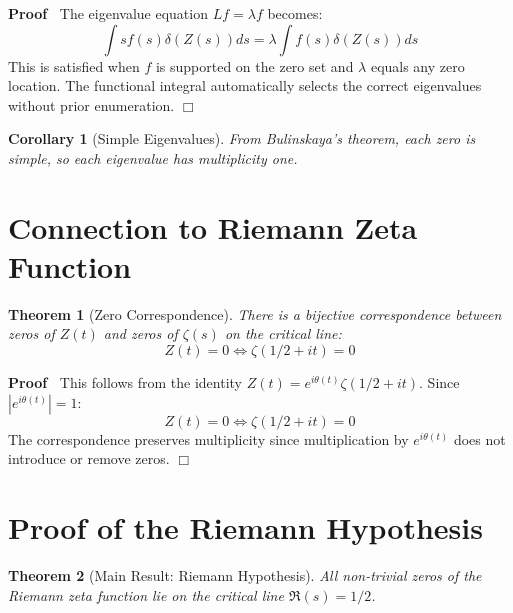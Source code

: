 \documentclass{article}
\newenvironment{proof}{\noindent\textbf{Proof\ }}{\hspace*{\fill}$\Box$\medskip}
\newtheorem{corollary}{Corollary}
\newtheorem{theorem}{Theorem}
\begin{document}
\begin{proof}
  The eigenvalue equation $Lf = \lambda f$ becomes:
  \begin{equation}
    \int sf (s) \delta (Z (s)) ds = \lambda \int f (s) \delta (Z (s)) ds
  \end{equation}
  This is satisfied when $f$ is supported on the zero set and $\lambda$ equals
  any zero location. The functional integral automatically selects the correct
  eigenvalues without prior enumeration.
\end{proof}

\begin{corollary}
  [Simple Eigenvalues] From Bulinskaya's theorem, each zero is simple, so each
  eigenvalue has multiplicity one.
\end{corollary}

\section{Connection to Riemann Zeta Function}

\begin{theorem}
  [Zero Correspondence] There is a bijective correspondence between zeros of
  $Z (t)$ and zeros of $\zeta (s)$ on the critical line:
  \begin{equation}
    Z (t) = 0 \Leftrightarrow \zeta (1 / 2 + it) = 0
  \end{equation}
\end{theorem}

\begin{proof}
  This follows from the identity $Z (t) = e^{i \theta (t)} \zeta (1 / 2 +
  it)$. Since $|e^{i \theta (t)} | = 1$:
  \begin{equation}
    Z (t) = 0 \Leftrightarrow \zeta (1 / 2 + it) = 0
  \end{equation}
  The correspondence preserves multiplicity since multiplication by $e^{i
  \theta (t)}$ does not introduce or remove zeros.
\end{proof}

\section{Proof of the Riemann Hypothesis}

\begin{theorem}
  [Main Result: Riemann Hypothesis] All non-trivial zeros of the Riemann zeta
  function lie on the critical line $\Re (s) = 1 / 2$.
\end{theorem}
\end{document}
